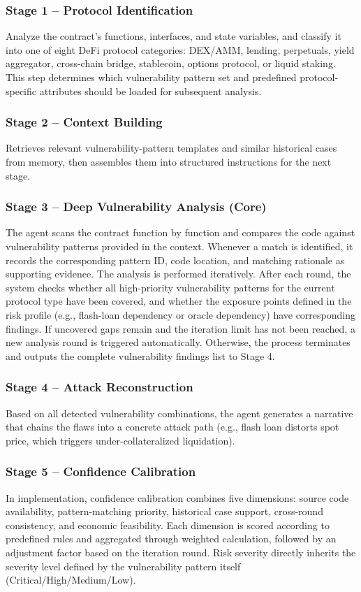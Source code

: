 \documentclass[10pt]{article}
\begin{document}
\subsubsection*{Stage 1 -- Protocol Identification}
Analyze the contract’s functions, interfaces, and state variables, and classify it into one of eight DeFi protocol categories: DEX/AMM, lending, perpetuals, yield aggregator, cross-chain bridge, stablecoin, options protocol, or liquid staking. This step determines which vulnerability pattern set and predefined protocol-specific attributes should be loaded for subsequent analysis.

\subsubsection*{Stage 2 -- Context Building}
Retrieves relevant vulnerability-pattern templates and similar historical cases from memory, then assembles them into structured instructions for the next stage.

\subsubsection*{Stage 3 -- Deep Vulnerability Analysis (Core)}
The agent scans the contract function by function and compares the code against vulnerability patterns provided in the context. Whenever a match is identified, it records the corresponding pattern ID, code location, and matching rationale as supporting evidence. The analysis is performed iteratively. After each round, the system checks whether all high-priority vulnerability patterns for the current protocol type have been covered, and whether the exposure points defined in the risk profile (e.g., flash-loan dependency or oracle dependency) have corresponding findings. If uncovered gaps remain and the iteration limit has not been reached, a new analysis round is triggered automatically. Otherwise, the process terminates and outputs the complete vulnerability findings list to Stage 4.

\subsubsection*{Stage 4 -- Attack Reconstruction}
Based on all detected vulnerability combinations, the agent generates a narrative that chains the flaws into a concrete attack path (e.g., flash loan distorts spot price, which triggers under-collateralized liquidation).

\subsubsection*{Stage 5 -- Confidence Calibration}
In implementation, confidence calibration combines five dimensions: source code availability, pattern-matching priority, historical case support, cross-round consistency, and economic feasibility. Each dimension is scored according to predefined rules and aggregated through weighted calculation, followed by an adjustment factor based on the iteration round. Risk severity directly inherits the severity level defined by the vulnerability pattern itself (Critical/High/Medium/Low). 
\end{document}
